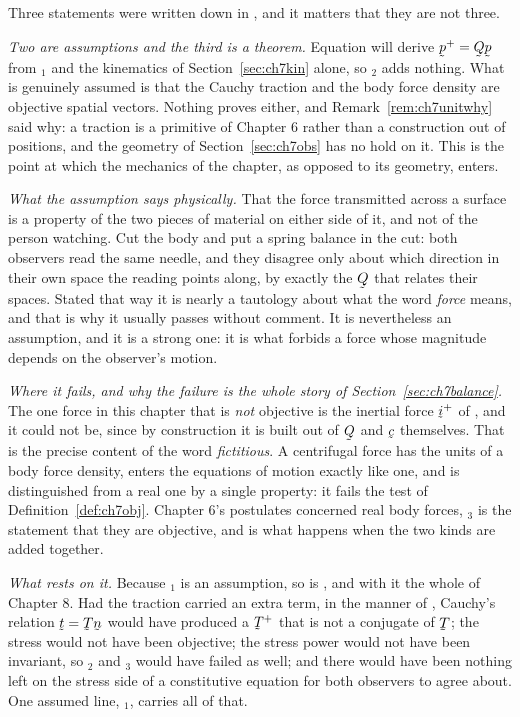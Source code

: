 \begin{remark}\label{rem:ch7tractionass}
Three statements were written down in , and it matters that
they are not three.

\emph{Two are assumptions and the third is a theorem.} Equation
 will derive $\bp^{+}=\bQ\bp$ from $_{1}$ and the
kinematics of Section~\ref{sec:ch7kin} alone, so $_{2}$ adds
nothing. What is genuinely assumed is that the Cauchy traction and the
body force density are objective spatial vectors. Nothing proves either,
and Remark~\ref{rem:ch7unitwhy} said why: a traction is a primitive of
Chapter 6 rather than a construction out of positions, and the geometry
of Section~\ref{sec:ch7obs} has no hold on it. This is the point at which
the mechanics of the chapter, as opposed to its geometry, enters.

\emph{What the assumption says physically.} That the force transmitted
across a surface is a property of the two pieces of material on either
side of it, and not of the person watching. Cut the body and put a spring
balance in the cut: both observers read the same needle, and they
disagree only about which direction in their own space the reading points
along, by exactly the $\bQ$ that relates their spaces. Stated that way it
is nearly a tautology about what the word \emph{force} means, and that is
why it usually passes without comment. It is nevertheless an assumption,
and it is a strong one: it is what forbids a force whose magnitude
depends on the observer's motion.

\emph{Where it fails, and why the failure is the whole story of
Section~\ref{sec:ch7balance}.} The one force in this chapter that is
\emph{not} objective is the inertial force $\vek{i}^{+}$ of ,
and it could not be, since by construction it is built out of $\bQ$ and
$\bc$ themselves. That is the precise content of the word
\emph{fictitious}. A centrifugal force has the units of a body force
density, enters the equations of motion exactly like one, and is
distinguished from a real one by a single property: it fails the test of
Definition~\ref{def:ch7obj}. Chapter 6's postulates concerned real body
forces, $_{3}$ is the statement that they are objective, and
 is what happens when the two kinds are added together.

\emph{What rests on it.} Because $_{1}$ is an assumption, so is
, and with it the whole of Chapter 8. Had the traction carried
an extra term, in the manner of , Cauchy's relation
$\bt=\bT\bn$ would have produced a $\bT^{+}$ that is not a conjugate of
$\bT$; the stress would not have been objective; the stress power would
not have been invariant, so $_{2}$ and $_{3}$ would
have failed as well; and there would have been nothing left on the stress
side of a constitutive equation for both observers to agree about. One
assumed line, $_{1}$, carries all of that.
\end{remark}

